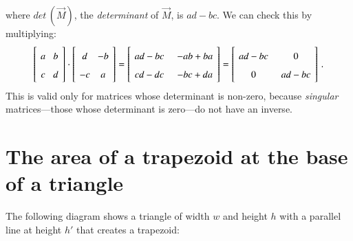 where $\textit{det}\,(\vec{M})$, the \emph{determinant} of $\vec{M}$, is $ad-bc$. We can check this by multiplying:
\[
\spacearray
\left[ \begin{array}{c} a\\c\end{array} \begin{array}{c} b\\d \end{array}\right] \cdot
\left[ \begin{array}{c} d\\-c\end{array} \begin{array}{c} -b\\a \end{array}\right] =
\left[ \begin{array}{c} ad-bc\\cd-dc\end{array} \;\;\begin{array}{c} -ab+ba\\-bc+da \end{array}\right] =
\left[ \begin{array}{c}ad-bc \\0\end{array}\;\; \begin{array}{c} 0\\ad-bc \end{array}\right]\,.
\]
This is valid only for matrices whose determinant is non-zero, because \emph{singular} matrices---those whose determinant is zero---do not have an inverse.


\section{The area of a trapezoid at the base of a triangle}\label{a.trap}

The following diagram shows a triangle of width $w$ and height $h$ with a parallel line at height $h'$ that creates a trapezoid:

\begin{center}
\end{center}

